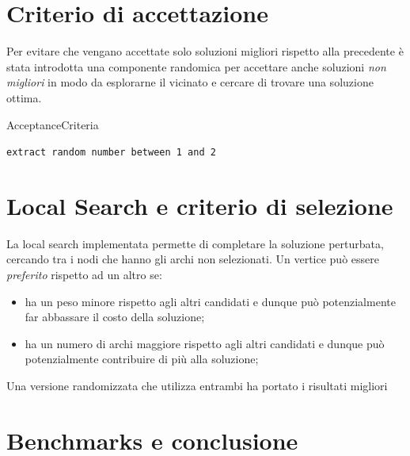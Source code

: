 \documentclass[11pt]{article}
\begin{document}
\pagebreak


\section{Criterio di accettazione}

Per evitare che vengano accettate solo soluzioni migliori rispetto alla precedente è stata introdotta una componente randomica per accettare anche soluzioni \textit{non migliori} in modo da esplorarne il vicinato e cercare di trovare una soluzione ottima.

\begin{algorithm}
    \caption{AcceptanceCriteria}
    \begin{algorithmic}
    \State{}
        \State{}
    \EndIf{}
    \State\texttt{extract random number between 1 and 2}
    \State{}
        \State{}
    \EndIf{}
    \State{}
\end{algorithmic}
\end{algorithm}


\section{Local Search e criterio di selezione}

La local search implementata permette di completare la soluzione perturbata, cercando tra i nodi che hanno gli archi non selezionati.
Un vertice può essere \textit{preferito} rispetto ad un altro se:

\begin{itemize}
    \item{ha un peso minore rispetto agli altri candidati e dunque può potenzialmente far abbassare il costo della soluzione;}
    \item{ha un numero di archi maggiore rispetto agli altri candidati e dunque può potenzialmente contribuire di più alla soluzione;}
\end{itemize}

Una versione randomizzata che utilizza entrambi ha portato i risultati migliori 


\pagebreak

\section{Benchmarks e conclusione}
\end{document}
